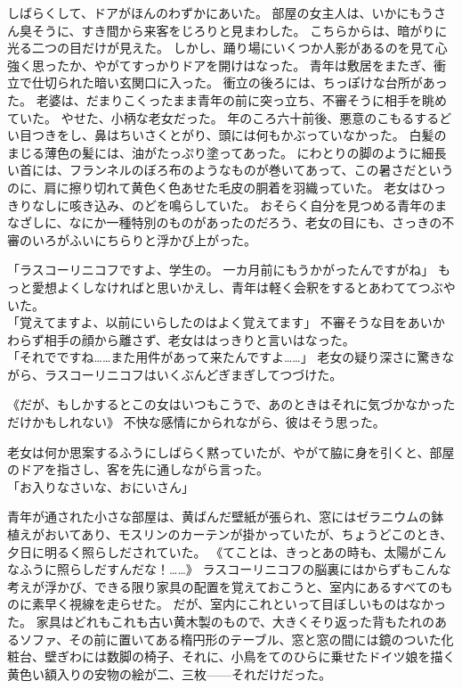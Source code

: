 しばらくして、ドアがほんのわずかにあいた。
部屋の女主人は、いかにもうさん臭そうに、すき間から来客をじろりと見まわした。
こちらからは、暗がりに光る二つの目だけが見えた。
しかし、踊り場にいくつか人影があるのを見て心強く思ったか、やがてすっかりドアを開けはなった。
青年は敷居をまたぎ、衝立で仕切られた暗い玄関口に入った。
衝立の後ろには、ちっぽけな台所があった。
老婆は、だまりこくったまま青年の前に突っ立ち、不審そうに相手を眺めていた。
やせた、小柄な老女だった。
年のころ六十前後、悪意のこもるするどい目つきをし、鼻はちいさくとがり、頭には何もかぶっていなかった。
白髪のまじる薄色の髪には、油がたっぷり塗ってあった。
にわとりの脚のように細長い首には、フランネルのぼろ布のようなものが巻いてあって、この暑さだというのに、肩に擦り切れて黄色く色あせた毛皮の胴着を羽織っていた。
老女はひっきりなしに咳き込み、のどを鳴らしていた。
おそらく自分を見つめる青年のまなざしに、なにか一種特別のものがあったのだろう、老女の目にも、さっきの不審のいろがふいにちらりと浮かび上がった。

「ラスコーリニコフですよ、学生の。
一カ月前にもうかがったんですがね」
もっと愛想よくしなければと思いかえし、青年は軽く会釈をするとあわててつぶやいた。\\
「覚えてますよ、以前にいらしたのはよく覚えてます」
不審そうな目をあいかわらず相手の顔から離さず、老女ははっきりと言いはなった。\\
「それでですね……また用件があって来たんですよ……」
老女の疑り深さに驚きながら、ラスコーリニコフはいくぶんどぎまぎしてつづけた。

《だが、もしかするとこの女はいつもこうで、あのときはそれに気づかなかっただけかもしれない》
不快な感情にかられながら、彼はそう思った。

老女は何か思案するふうにしばらく黙っていたが、やがて脇に身を引くと、部屋のドアを指さし、客を先に通しながら言った。\\
「お入りなさいな、おにいさん」

青年が通された小さな部屋は、黄ばんだ壁紙が張られ、窓にはゼラニウムの鉢植えがおいてあり、モスリンのカーテンが掛かっていたが、ちょうどこのとき、夕日に明るく照らしだされていた。
《てことは、きっとあの時も、太陽がこんなふうに照らしだすんだな！……》
ラスコーリニコフの脳裏にはからずもこんな考えが浮かび、できる限り家具の配置を覚えておこうと、室内にあるすべてのものに素早く視線を走らせた。
だが、室内にこれといって目ぼしいものはなかった。
家具はどれもこれも古い黄木製のもので、大きくそり返った背もたれのあるソファ、その前に置いてある楕円形のテーブル、窓と窓の間には鏡のついた化粧台、壁ぎわには数脚の椅子、それに、小鳥をてのひらに乗せたドイツ娘を描く黄色い額入りの安物の絵が二、三枚——それだけだった。

